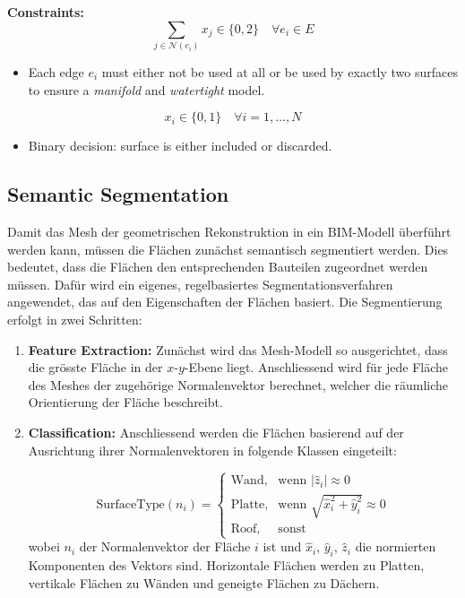 \begin{English}
    \vspace{1em}
    \noindent
    \textbf{Constraints:}
    \[
    \sum_{j \in \mathcal{N}(e_i)} x_j \in \{0, 2\} \quad \forall e_i \in E
    \]
    \begin{itemize}
    \item Each edge $e_i$ must either not be used at all or be used by exactly two surfaces to ensure a \textit{manifold} and \textit{watertight} model.
    \end{itemize}
    \[
    x_i \in \{0, 1\} \quad \forall i = 1, \dots, N
    \]
    \begin{itemize}
    \item Binary decision: surface is either included or discarded.
    \end{itemize}
\end{English}

\subsection{Semantic Segmentation}
\begin{German}
    Damit das Mesh der geometrischen Rekonstruktion in ein BIM-Modell überführt werden kann, müssen die Flächen zunächst semantisch segmentiert werden. Dies bedeutet, dass die Flächen den entsprechenden Bauteilen zugeordnet werden müssen. Dafür wird ein eigenes, regelbasiertes Segmentationsverfahren angewendet, das auf den Eigenschaften der Flächen basiert. Die Segmentierung erfolgt in zwei Schritten:

    \begin{enumerate}
        \item \textbf{Feature Extraction:} Zunächst wird das Mesh-Modell so ausgerichtet, dass die grösste Fläche in der $x$-$y$-Ebene liegt. Anschliessend wird für jede Fläche des Meshes der zugehörige Normalenvektor berechnet, welcher die räumliche Orientierung der Fläche beschreibt.
        \item \textbf{Classification:} Anschliessend werden die Flächen basierend auf der Ausrichtung ihrer Normalenvektoren in folgende Klassen eingeteilt:
        
        \begin{equation*}
        \text{SurfaceType}(n_i) = 
        \begin{cases}
            \text{Wand}, & \text{wenn } |\hat{z}_i| \approx 0 \\
            \text{Platte}, & \text{wenn } \sqrt{\hat{x}_i^2 + \hat{y}_i^2} \approx 0 \\
            \text{Roof}, & \text{sonst}
        \end{cases}
        \end{equation*}
        wobei $n_i$ der Normalenvektor der Fläche $i$ ist und $\hat{x}_i$, $\hat{y}_i$, $\hat{z}_i$ die normierten Komponenten des Vektors sind. Horizontale Flächen werden zu Platten, vertikale Flächen zu Wänden und geneigte Flächen zu Dächern.
    \end{enumerate}
\end{German}


